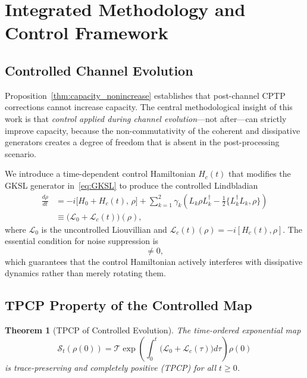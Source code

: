 \documentclass[journal,twocolumn]{IEEEtran}
\theoremstyle{definition}
\theoremstyle{plain}
\newtheorem{theorem}{Theorem}[section]
\begin{document}
\section{Integrated Methodology and Control Framework}
\label{sec:methodology}

\subsection{Controlled Channel Evolution}

Proposition~\ref{thm:capacity_nonincrease} establishes that
post-channel CPTP corrections cannot increase capacity.  The central
methodological insight of this work is that \emph{control applied
during channel evolution}---not after---can strictly improve
capacity, because the non-commutativity of the coherent and
dissipative generators creates a degree of freedom that is absent in
the post-processing scenario.

We introduce a time-dependent control Hamiltonian $H_c(t)$ that
modifies the GKSL generator in~\eqref{eq:GKSL} to produce the
controlled Lindbladian
\begin{align}
  \frac{d\rho}{dt} &= -i\bigl[H_0 + H_c(t),\, \rho\bigr]
  + \sum_{k=1}^2 \gamma_k\!\left(L_k\rho L_k^\dagger
    - \tfrac{1}{2}\{L_k^\dagger L_k, \rho\}\right) \nonumber\\
  &\equiv \bigl(\mathcal{L}_0 + \mathcal{L}_c(t)\bigr)(\rho),
  \label{eq:controlled_dynamics}
\end{align}
where $\mathcal{L}_0$ is the uncontrolled Liouvillian and
$\mathcal{L}_c(t)(\rho) = -i[H_c(t), \rho]$.  The essential
condition for noise suppression is
\begin{equation}
  [\mathcal{L}_0,\, \mathcal{L}_c(t)] \ne 0,
  \label{eq:noncommutativity}
\end{equation}
which guarantees that the control Hamiltonian actively interferes
with dissipative dynamics rather than merely rotating them.

\subsection{TPCP Property of the Controlled Map}

\begin{theorem}[TPCP of Controlled Evolution]
\label{thm:tpcp}
The time-ordered exponential map
\begin{equation}
  \mathcal{S}_t(\rho(0)) = \mathcal{T}\!\exp\!\left(
    \int_0^t \bigl(\mathcal{L}_0 + \mathcal{L}_c(\tau)\bigr)
    d\tau\right)\!\rho(0)
  \label{eq:controlled_evolution}
\end{equation}
is trace-preserving and completely positive (TPCP) for all $t \ge 0$.
\end{theorem}
\end{document}
